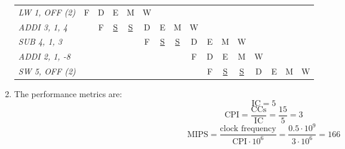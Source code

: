 \begin{enumerate}
\begin{table}[H]
\begin{tabular}{l|ccccccccccccccc}
            \textit{LW 1, OFF (2)}  & F          & D          & E          & M          & W          &            &            &            &            &             &             &             &             &             &             \\
            \textit{ADDI 3, 1, 4}   &            & F          & \underline{S}    & \underline{S}     & D          & E          & M          & W          &            &             &             &             &             &             &             \\
            \textit{SUB 4, 1, 3}  &            &            &            &            & F          & \underline{S}     & \underline{S}     & D          & E          & M           & W           &             &             &             &             \\
            \textit{ADDI 2, 1, -8}  &            &            &            &            &            &            &            & F          & D          & E           & M           & W           &             &             &             \\
            \textit{SW 5, OFF (2)}  &            &            &            &            &            &            &            &            & F          & \underline{S}      & \underline{S}      & D           & E           & M           & W          
            \end{tabular}
        \end{table}
    \item The performance metrics are: 
        \[\text{IC}=5\]
        \[\text{CPI}=\dfrac{\text{CCs}}{\text{IC}}=\dfrac{15}{5}=3\]
        \[\text{MIPS}=\dfrac{\text{clock frequency}}{\text{CPI} \cdot 10^6}=\dfrac{0.5\cdot 10^9}{3 \cdot 10^6}=166\]
\end{enumerate}